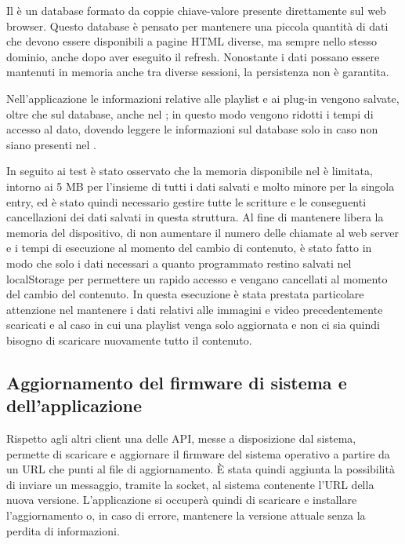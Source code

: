 Il  è un database formato da coppie chiave-valore presente direttamente sul web browser. Questo database è pensato per mantenere una piccola quantità di dati che devono essere disponibili a pagine HTML diverse, ma sempre nello stesso dominio, anche dopo aver eseguito il refresh. Nonostante i dati possano essere mantenuti in memoria anche tra diverse sessioni, la persistenza non è garantita.  

Nell'applicazione le informazioni relative alle playlist e ai plug-in vengono salvate, oltre che sul database, anche nel ; in questo modo vengono ridotti i tempi di accesso al dato, dovendo leggere le informazioni sul database solo in caso non siano presenti nel .

In seguito ai test è stato osservato che la memoria disponibile nel  è limitata, intorno ai 5 MB per l'insieme di tutti i dati salvati e molto minore per la singola entry, ed è stato quindi necessario gestire tutte le scritture e le conseguenti cancellazioni dei dati salvati in questa struttura. Al fine di mantenere libera la memoria del dispositivo, di non aumentare il numero delle chiamate al web server e i tempi di esecuzione al momento del cambio di contenuto, è stato fatto in modo che solo i dati necessari a quanto programmato restino salvati nel localStorage per permettere un rapido accesso e vengano cancellati al momento del cambio del contenuto. In questa esecuzione è stata prestata particolare attenzione nel mantenere i dati relativi alle immagini e video precedentemente scaricati e al caso in cui una playlist venga solo aggiornata e non ci sia quindi bisogno di scaricare nuovamente tutto il contenuto.

\subsection{Aggiornamento del firmware di sistema e dell'applicazione}\label{update}

Rispetto agli altri client una delle API, messe a disposizione dal sistema, permette di scaricare e aggiornare il firmware del sistema operativo a partire da un URL che punti al file di aggiornamento.
È stata quindi aggiunta la possibilità di inviare un messaggio, tramite la socket, al sistema contenente l'URL della nuova versione. L'applicazione si occuperà quindi di scaricare e installare l'aggiornamento o, in caso di errore, mantenere la versione attuale senza la perdita di informazioni.

